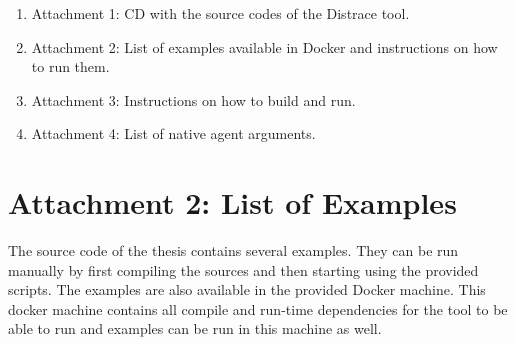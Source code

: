 \documentclass[12pt,a4paper]{report}
\let\openright=\clearpage
\begin{document}


\setcounter{tocdepth}{1}
\tableofcontents











\listoffigures





\begin{enumerate}
	\item Attachment 1: CD with the source codes of the Distrace tool.
	\item Attachment 2: List of examples available in Docker and instructions on how to run them.
	\item Attachment 3: Instructions on how to build and run.
	\item Attachment 4: List of native agent arguments.
	\end{enumerate}
\openright

\setcounter{page}{1}
\chapter*{Attachment 2: List of Examples}
The source code of the thesis contains several examples. They can be run manually by first compiling the sources and then starting using the provided scripts. The examples are also available in the provided Docker machine. This docker machine contains all compile and run-time dependencies for the tool to be able to run and examples can be run in this machine as well.
\end{document}
